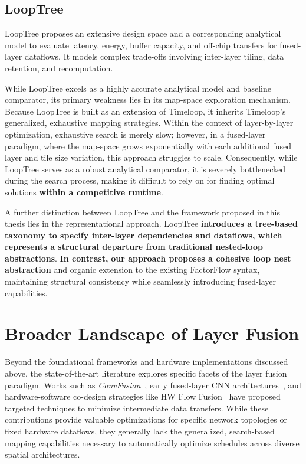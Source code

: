 \subsection{LoopTree}
LoopTree \cite{gilbert2024looptree} proposes an extensive design space and a corresponding analytical model to evaluate latency, energy, buffer capacity, and off-chip transfers for fused-layer dataflows. It models complex trade-offs involving inter-layer tiling, data retention, and recomputation. 

While LoopTree excels as a highly accurate analytical model and baseline comparator, its primary weakness lies in its map-space exploration mechanism. Because LoopTree is built as an extension of Timeloop, it inherits Timeloop's generalized, exhaustive mapping strategies. Within the context of layer-by-layer optimization, exhaustive search is merely slow; however, in a fused-layer paradigm, where the map-space grows exponentially with each additional fused layer and tile size variation, this approach struggles to scale. Consequently, while LoopTree serves as a robust analytical comparator, it is severely bottlenecked during the search process, making it difficult to rely on for finding optimal solutions \textbf{within a competitive runtime}.

A further distinction between LoopTree and the framework proposed in this thesis lies in the representational approach. LoopTree \textbf{introduces a tree-based taxonomy to specify inter-layer dependencies and dataflows, which represents a structural departure from traditional nested-loop abstractions}. \textbf{In contrast,} \textbf{our approach proposes a cohesive loop nest abstraction} and organic extension to the existing FactorFlow syntax, maintaining structural consistency while seamlessly introducing fused-layer capabilities.


\section{Broader Landscape of Layer Fusion}

Beyond the foundational frameworks and hardware implementations discussed above, the state-of-the-art literature explores specific facets of the layer fusion paradigm. Works such as \emph{ConvFusion}~\cite{waeijen2021convfusion}, early fused-layer CNN architectures~\cite{alwani2016fusedlayer}, and hardware-software co-design strategies like HW Flow Fusion~\cite{hwflow} have proposed targeted techniques to minimize intermediate data transfers.  While these contributions provide valuable optimizations for specific network topologies or fixed hardware dataflows, they generally lack the generalized, search-based mapping capabilities necessary to automatically optimize schedules across diverse spatial architectures. 

